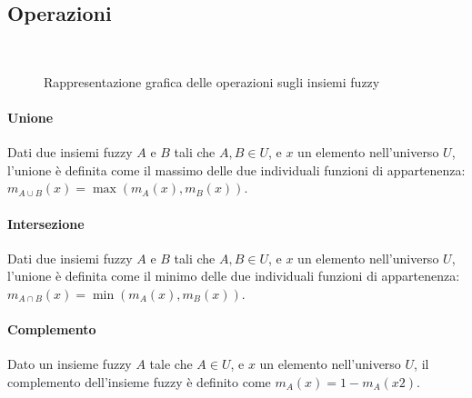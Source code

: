 \subsection{Operazioni}

\begin{figure}[hbt]
\centering
{} \quad
{} \\
 \quad
\caption{Rappresentazione grafica delle operazioni sugli insiemi fuzzy}
\label{fig:operazioni}
\end{figure}

\paragraph{Unione}
Dati due insiemi fuzzy $A$ e $B$ tali che $A,B \in U$, e $x$ un elemento nell'universo $U$, l'unione è definita come il massimo delle due individuali funzioni di appartenenza: $m_{A \cup B} (x) = \max (m_A (x), m_B (x)) $.

\paragraph{Intersezione}
Dati due insiemi fuzzy $A$ e $B$ tali che $A,B \in U$, e $x$ un elemento nell'universo $U$, l'unione è definita come il minimo delle due individuali funzioni di appartenenza: $m_{A \cap B} (x) = \min (m_A (x), m_B (x)) $.

\paragraph{Complemento}
Dato un insieme fuzzy $A$ tale che $A \in U$, e $x$ un elemento nell'universo $U$, il complemento dell'insieme fuzzy è definito come $m_A (x) = 1-m_A (x2)$.